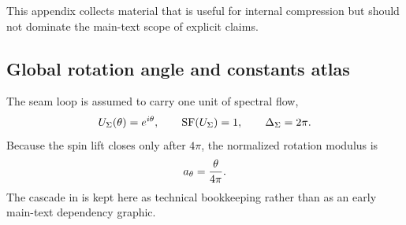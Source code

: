 This appendix collects material that is useful for internal compression but should not dominate the main-text scope of explicit claims.

\subsection{Global rotation angle and constants atlas}

The seam loop is assumed to carry one unit of spectral flow,
\[
U_{\Sigma}(\theta)=e^{i\theta},
\qquad
\operatorname{SF}(U_{\Sigma})=1,
\qquad
\Delta_{\Sigma}=2\pi.
\]
Because the spin lift closes only after $4\pi$, the normalized rotation modulus is
\[
a_\theta=\frac{\theta}{4\pi}.
\]
The cascade in  is kept here as technical bookkeeping rather than as an early main-text dependency graphic.

